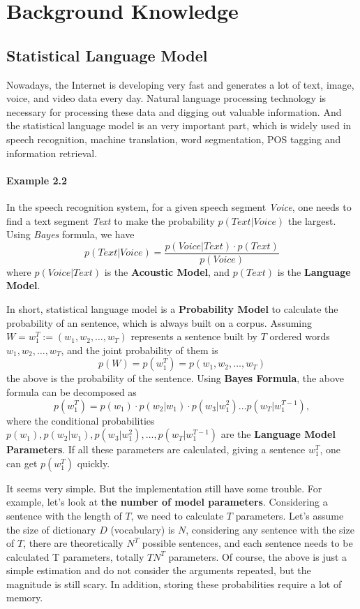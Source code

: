 \section{Background Knowledge}
\subsection{Statistical Language Model}
Nowadays, the Internet is developing very fast and generates a lot of text, image, voice, and video data every day. Natural language processing technology is necessary for processing these data and digging out valuable information. And the statistical language model is an very important part, which is widely used in speech recognition, machine translation, word segmentation, POS tagging and information retrieval. 
\paragraph{Example 2.2} In the speech recognition system, for a given speech segment \emph{Voice}, one needs to find a text segment \emph{Text} to make the probability $p(Text|Voice)$ the largest. Using \emph{Bayes} formula, we have
$$p(Text|Voice)=\frac{p(Voice|Text)\cdot p(Text)}{p(Voice)}$$
where $p(Voice|Text)$ is the \textbf{Acoustic Model}, and $p(Text)$ is the \textbf{Language Model}.

In short, statistical language model is a \textbf{Probability Model} to calculate the probability of an sentence, which is always built on a corpus. Assuming $W=w^T_1:=(w_1,w_2,\ldots,w_T)$ represents a sentence built by $T$ ordered words $w_1,w_2,\ldots,w_T$, and the joint probability of them is
$$p(W)=p(w^T_1)=p(w_1,w_2,\ldots,w_T)$$
the above is the probability of the sentence. Using \textbf{Bayes Formula}, the above formula can be decomposed as
\begin{equation}
p(w^T_1) = p(w_1)\cdot p(w_2|w_1)\cdot p(w_3|w^2_1)\ldots p(w_T|w^{T-1}_1),
\end{equation}
where the conditional probabilities $p(w_1),p(w_2|w_1),p(w_3|w^2_1),\ldots,p(w_T|w^{T-1}_1)$ are the \textbf{Language Model Parameters}. If all these parameters are calculated, giving a sentence $w^T_1$, one can get $p(w^T_1)$ quickly.

It seems very simple. But the implementation still have some trouble. For example, let's look at \textbf{the number of model parameters}. Considering a sentence with the length of $T$, we need to calculate $T$ parameters. Let's assume the size of dictionary $D$ (vocabulary) is $N$, considering any sentence with the size of $T$, there are theoretically $N^T$  possible sentences, and each sentence needs to be calculated T parameters, totally $TN^T$ parameters. Of course, the above is just a simple estimation and do not consider the arguments repeated, but the magnitude is still scary. In addition, storing these probabilities require a lot of memory.

